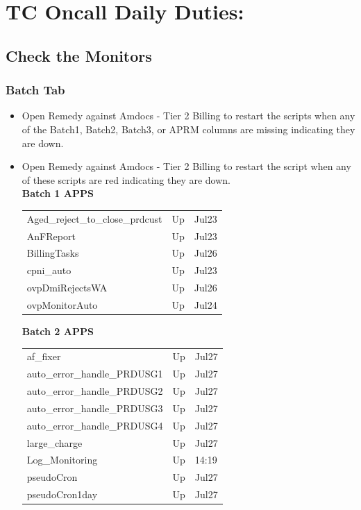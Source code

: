 \documentclass[12pt,twoside]{article}
\begin{document}
\newpage
\section{TC Oncall Daily Duties:}
\label{sec-4}
\subsection{Check the Monitors}
\label{sec-4-1}
\subsubsection{Batch Tab}
\label{sec-4-1-1}

\begin{itemize}
\item Open Remedy against Amdocs - Tier 2 Billing to restart the scripts when any of the Batch1, Batch2, Batch3, or APRM columns are missing indicating they are down.
\item Open Remedy against Amdocs - Tier 2 Billing to restart the script when any of these scripts are red indicating they are down.\\
\textbf{Batch 1 APPS}\\

\begin{center}
\begin{tabular}{lll}
\hline
 Aged\_reject\_to\_close\_prdcust  &  Up  &  Jul23  \\
 AnFReport                         &  Up  &  Jul23  \\
 BillingTasks                      &  Up  &  Jul26  \\
 cpni\_auto                        &  Up  &  Jul23  \\
 ovpDmiRejectsWA                   &  Up  &  Jul26  \\
 ovpMonitorAuto                    &  Up  &  Jul24  \\
\hline
\end{tabular}
\end{center}


    \textbf{Batch 2 APPS}\\

\begin{center}
\begin{tabular}{lll}
\hline
 af\_fixer                     &  Up  &  Jul27  \\
 auto\_error\_handle\_PRDUSG1  &  Up  &  Jul27  \\
 auto\_error\_handle\_PRDUSG2  &  Up  &  Jul27  \\
 auto\_error\_handle\_PRDUSG3  &  Up  &  Jul27  \\
 auto\_error\_handle\_PRDUSG4  &  Up  &  Jul27  \\
 large\_charge                 &  Up  &  Jul27  \\
 Log\_Monitoring               &  Up  &  14:19  \\
 pseudoCron                    &  Up  &  Jul27  \\
 pseudoCron1day                &  Up  &  Jul27  \\
\hline
\end{tabular}
\end{center}



\end{itemize}
\end{document}
